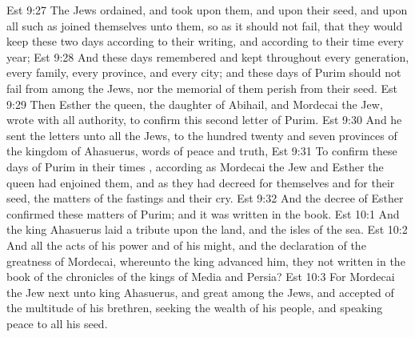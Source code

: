 \vs Est 9:27 The Jews ordained, and took upon them, and upon their seed, and upon all such as joined themselves unto them, so as it should not fail, that they would keep these two days according to their writing, and according to their  time every year;
\vs Est 9:28 And  these days  remembered and kept throughout every generation, every family, every province, and every city; and  these days of Purim should not fail from among the Jews, nor the memorial of them perish from their seed.
\vs Est 9:29 Then Esther the queen, the daughter of Abihail, and Mordecai the Jew, wrote with all authority, to confirm this second letter of Purim.
\vs Est 9:30 And he sent the letters unto all the Jews, to the hundred twenty and seven provinces of the kingdom of Ahasuerus,  words of peace and truth,
\vs Est 9:31 To confirm these days of Purim in their times , according as Mordecai the Jew and Esther the queen had enjoined them, and as they had decreed for themselves and for their seed, the matters of the fastings and their cry.
\vs Est 9:32 And the decree of Esther confirmed these matters of Purim; and it was written in the book.
\vs Est 10:1 And the king Ahasuerus laid a tribute upon the land, and  the isles of the sea.
\vs Est 10:2 And all the acts of his power and of his might, and the declaration of the greatness of Mordecai, whereunto the king advanced him,  they not written in the book of the chronicles of the kings of Media and Persia?
\vs Est 10:3 For Mordecai the Jew  next unto king Ahasuerus, and great among the Jews, and accepted of the multitude of his brethren, seeking the wealth of his people, and speaking peace to all his seed.
